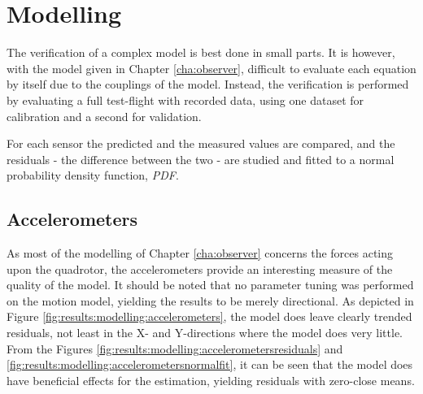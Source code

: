 \section{Modelling}
    The verification of a complex model is best done in small parts.
    It is however, with the model given in Chapter \ref{cha:observer},
    difficult to evaluate each equation by itself due to the couplings of the model.
    Instead, the verification is performed by evaluating a full test-flight
    with recorded data, using one dataset for calibration and a second for validation.

    For each sensor the predicted and the measured values are compared,
    and the residuals - the difference between the two - are studied and
    fitted to a normal probability density function, \textit{PDF}.

    \subsection{Accelerometers}
        As most of the modelling of Chapter \ref{cha:observer} concerns
        the forces acting upon the quadrotor, the accelerometers
        provide an interesting measure of the quality of the model.
        It should be noted that no parameter tuning was performed on the motion model,
        yielding the results to be merely directional.
        As depicted in Figure \ref{fig:results:modelling:accelerometers},
        the model does leave clearly trended residuals, not least in the
        X- and Y-directions where the model does very little.
        From the Figures \ref{fig:results:modelling:accelerometersresiduals} and \ref{fig:results:modelling:accelerometersnormalfit},
        it can be seen that the model does have beneficial
        effects for the estimation, yielding residuals with zero-close means.

